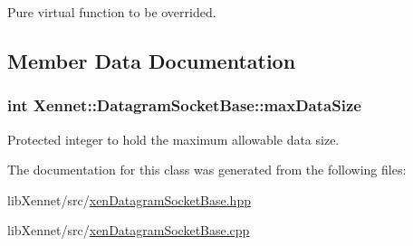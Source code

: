 Pure virtual function to be overrided. 



\subsection{Member Data Documentation}
\hypertarget{classXennet_1_1DatagramSocketBase_a5168c12db4203f683f0b0dbda6c61b5}{
\subsubsection{\setlength{\rightskip}{0pt plus 5cm}int {\bf Xennet::DatagramSocketBase::maxDataSize}}}
\label{classXennet_1_1DatagramSocketBase_a5168c12db4203f683f0b0dbda6c61b5}


Protected integer to hold the maximum allowable data size. 



The documentation for this class was generated from the following files:\begin{CompactItemize}
\item 
libXennet/src/\hyperlink{xenDatagramSocketBase_8hpp}{xenDatagramSocketBase.hpp}\item 
libXennet/src/\hyperlink{xenDatagramSocketBase_8cpp}{xenDatagramSocketBase.cpp}\end{CompactItemize}
